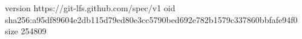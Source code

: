 version https://git-lfs.github.com/spec/v1
oid sha256:a95df89604e2db115d79ed80e3cc5790bed692e782b1579c337860bbfafe94f0
size 254809
